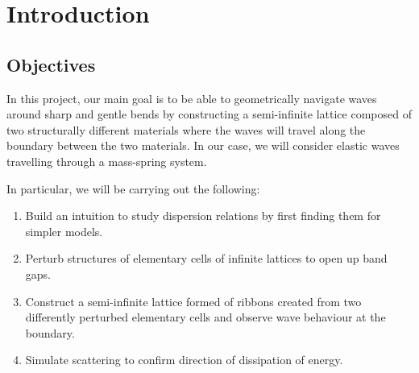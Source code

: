 \chapter{Introduction}

\section{Objectives}
In this project, our main goal is to be able to geometrically navigate waves
around sharp and gentle bends by constructing a semi-infinite lattice composed
of two structurally different materials where the waves will travel along the
boundary between the two materials. In our case, we will consider elastic waves
travelling through a mass-spring system.

In particular, we will be carrying out the following:

\begin{enumerate}
\item Build an intuition to study dispersion relations by first finding them
      for simpler models.
\item Perturb structures of elementary cells of infinite lattices to open up
      band gaps.
\item Construct a semi-infinite lattice formed of ribbons created from two
      differently perturbed elementary cells and observe wave behaviour at the
      boundary.
\item Simulate scattering to confirm direction of dissipation of energy.
\end{enumerate}


